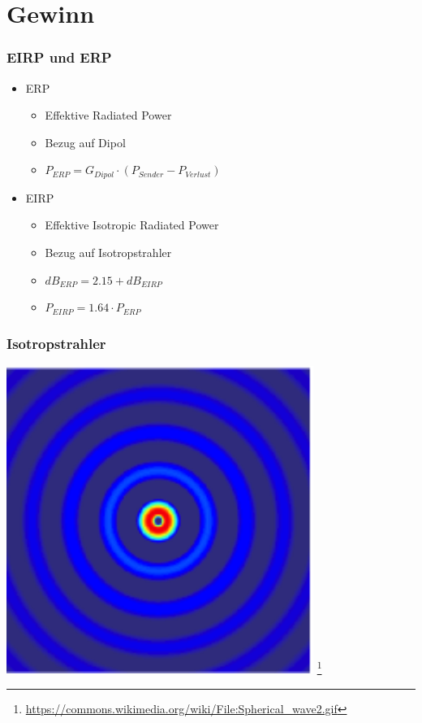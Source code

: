 \section*{Gewinn}

\begin{frame}
    \frametitle{EIRP und ERP}
    \begin{itemize}
    	\item ERP
		    \begin{itemize}
				\item Effektive Radiated Power
       		 	\item Bezug auf Dipol
       		 	\item $P_{ERP} = G_{Dipol} \cdot (P_{Sender} - P_{Verlust})$
 		   	\end{itemize}
		\item EIRP
		    \begin{itemize}
				\item Effektive Isotropic Radiated Power
       		 	\item Bezug auf Isotropstrahler
       		 	\item $dB_{ERP} = 2.15 + dB_{EIRP}$
       		 	\item $P_{EIRP} = 1.64 \cdot P_{ERP}$
 		   	\end{itemize}
    \end{itemize}
\end{frame}

\begin{frame}
    \frametitle{Isotropstrahler}
    \begin{center}
        \includegraphics[width=0.75\textwidth]{e11/Spherical_wave2.png}
        \footnote{\tiny \url{https://commons.wikimedia.org/wiki/File:Spherical_wave2.gif}}
	\end{center}
\end{frame}

